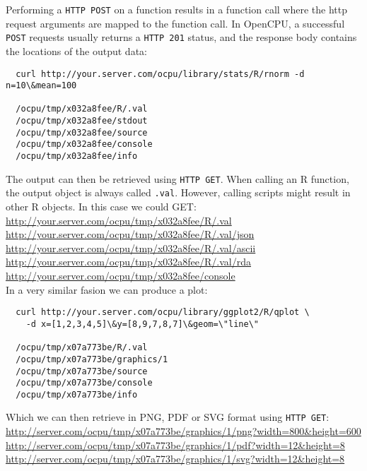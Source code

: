 \documentclass{scrartcl}\usepackage[]{graphicx}\usepackage[]{color}
\begin{document}
\noindent Performing a \texttt{HTTP POST} on a function results in a function call where the http request arguments are mapped to the function call. In OpenCPU, a successful \texttt{POST} requests usually returns a \texttt{HTTP 201} status, and the response body contains the locations of the output data:

\begin{verbatim}
  curl http://your.server.com/ocpu/library/stats/R/rnorm -d n=10\&mean=100
  
  /ocpu/tmp/x032a8fee/R/.val
  /ocpu/tmp/x032a8fee/stdout
  /ocpu/tmp/x032a8fee/source
  /ocpu/tmp/x032a8fee/console
  /ocpu/tmp/x032a8fee/info
\end{verbatim}
The output can then be retrieved using \texttt{HTTP GET}. When calling an R function, the output object is always called \texttt{.val}. However, calling scripts might result in other R objects. In this case we could GET: \\

\indent \url{http://your.server.com/ocpu/tmp/x032a8fee/R/.val} \\
\indent \url{http://your.server.com/ocpu/tmp/x032a8fee/R/.val/json} \\
\indent \url{http://your.server.com/ocpu/tmp/x032a8fee/R/.val/ascii} \\
\indent \url{http://your.server.com/ocpu/tmp/x032a8fee/R/.val/rda} \\
\indent \url{http://your.server.com/ocpu/tmp/x032a8fee/console} \\

\noindent In a very similar fasion we can produce a plot:

\begin{verbatim}
  curl http://your.server.com/ocpu/library/ggplot2/R/qplot \
    -d x=[1,2,3,4,5]\&y=[8,9,7,8,7]\&geom=\"line\"
  
  /ocpu/tmp/x07a773be/R/.val
  /ocpu/tmp/x07a773be/graphics/1
  /ocpu/tmp/x07a773be/source
  /ocpu/tmp/x07a773be/console
  /ocpu/tmp/x07a773be/info  
\end{verbatim}
Which we can then retrieve in PNG, PDF or SVG format using \texttt{HTTP GET}: \\

\indent \url{http://server.com/ocpu/tmp/x07a773be/graphics/1/png?width=800&height=600} \\
\indent \url{http://server.com/ocpu/tmp/x07a773be/graphics/1/pdf?width=12&height=8} \\
\indent \url{http://server.com/ocpu/tmp/x07a773be/graphics/1/svg?width=12&height=8} \\
\end{document}
